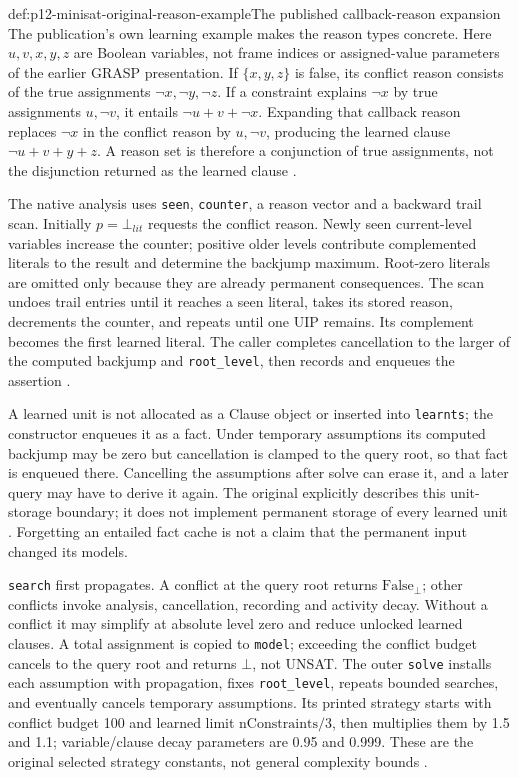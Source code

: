\begin{hbexample}{def:p12-minisat-original-reason-example}{The published callback-reason expansion}
The publication's own learning example makes the reason types concrete.
Here \(u,v,x,y,z\) are Boolean variables, not frame indices or assigned-value
parameters of the earlier GRASP presentation.
If \(\{x,y,z\}\) is false, its conflict reason consists of the true
assignments \(\neg x,\neg y,\neg z\).  If a constraint explains
\(\neg x\) by true assignments \(u,\neg v\), it entails
\(\neg u+v+\neg x\).  Expanding that callback reason replaces
\(\neg x\) in the conflict reason by \(u,\neg v\), producing the
learned clause \(\neg u+v+y+z\).  A reason set is therefore a conjunction
of true assignments, not the disjunction returned as the learned clause
\cite[Sec.~4.4, p.~513]{EenSorensson2003}.
\end{hbexample}

The native analysis uses \texttt{seen}, \texttt{counter}, a reason vector and
a backward trail scan.  Initially \(p=\bot_{lit}\) requests the conflict
reason.  Newly seen current-level variables increase the counter; positive
older levels contribute complemented literals to the result and determine
the backjump maximum.  Root-zero literals are omitted only because they are
already permanent consequences.  The scan undoes trail entries until it
reaches a seen literal, takes its stored reason, decrements the counter, and
repeats until one UIP remains.  Its complement becomes the first learned
literal.  The caller completes cancellation to the larger of the computed
backjump and \texttt{root\_level}, then records and enqueues the assertion
\cite[Fig.~7]{EenSorensson2003}.

A learned unit is not allocated as a Clause object or inserted into
\texttt{learnts}; the constructor enqueues it as a fact.  Under temporary
assumptions its computed backjump may be zero but cancellation is clamped to
the query root, so that fact is enqueued there.  Cancelling the assumptions
after solve can erase it, and a later query may have to derive it again.
The original explicitly describes this unit-storage boundary; it does not
implement permanent storage of every learned unit
\cite[p.~514]{EenSorensson2003}.  Forgetting an entailed
fact cache is not a claim that the permanent input changed its models.

\texttt{search} first propagates.  A conflict at the query root returns
\(\mathrm{False}_{\bot}\); other conflicts invoke analysis, cancellation,
recording and activity decay.  Without a conflict it may simplify at absolute
level zero and reduce unlocked learned clauses.  A total assignment is copied
to \texttt{model}; exceeding the conflict budget cancels to the query root
and returns \(\bot\), not UNSAT.  The outer \texttt{solve} installs each
assumption with propagation, fixes \texttt{root\_level}, repeats bounded
searches, and eventually cancels temporary assumptions.  Its printed strategy
starts with conflict budget 100 and learned limit \(\mathrm{nConstraints}/3\),
then multiplies them by 1.5 and 1.1; variable/clause decay parameters are
0.95 and 0.999.  These are the original selected strategy constants, not
general complexity bounds \cite[Fig.~8]{EenSorensson2003}.

